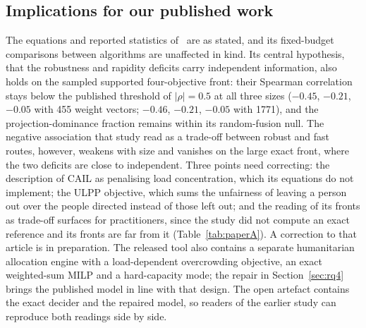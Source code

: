 \documentclass[systems,article,submit,moreauthors,pdftex]{Definitions/mdpi}
\begin{document}
\subsection{Implications for our published work}
The equations and reported statistics of~\cite{rabiei2026resilient} are as stated, and its
fixed-budget comparisons between algorithms are unaffected in kind. Its central hypothesis,
that the robustness and rapidity deficits carry independent information, also holds on the
sampled supported four-objective front: their Spearman correlation stays below the published
threshold of $|\rho| = 0.5$ at all three sizes ($-0.45$, $-0.21$, $-0.05$ with 455 weight
vectors; $-0.46$, $-0.21$, $-0.05$ with 1771), and the projection-dominance fraction remains
within its random-fusion null. The negative association that study read as a trade-off
between robust and fast routes, however, weakens with size and vanishes on the large exact
front, where the two deficits are close to independent. Three points need correcting: the
description of CAIL as penalising load concentration, which its equations do not implement; the
ULPP objective, which sums the unfairness of leaving a person out over the people directed
instead of those left out; and the
reading of its fronts as trade-off surfaces for practitioners, since the study did not compute an
exact reference and its fronts are far from it (Table~\ref{tab:paperA}). A correction to that
article is in preparation. The released tool also contains a separate humanitarian allocation
engine with a load-dependent overcrowding objective, an exact weighted-sum MILP and a
hard-capacity mode; the repair in Section~\ref{sec:rq4} brings the published model in line with
that design. The open artefact contains the exact decider and the repaired model, so readers of
the earlier study can reproduce both readings side by side.
\end{document}

